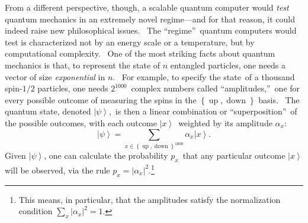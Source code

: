 \documentclass[12pt,onecolumn]{article}%
\begin{document}
From a different perspective, though, a scalable quantum computer would
\textit{test }quantum mechanics\textit{ }in an extremely novel regime---and
for that reason, it could indeed raise new philosophical issues. \ The
\textquotedblleft regime\textquotedblright\ quantum computers would test is
characterized not by an energy scale or a temperature, but by computational
complexity. \ One of the most striking facts about quantum mechanics is that,
to represent the state of $n$ entangled particles, one needs a vector of size
\textit{exponential} in $n$. \ For example, to specify the state\ of a
thousand spin-$1/2$ particles, one needs $2^{1000}$\ complex numbers called
\textquotedblleft amplitudes,\textquotedblright\ one for every possible
outcome of measuring the spins in the $\left\{  \operatorname*{up}%
,\operatorname*{down}\right\}  $ basis. \ The quantum state, denoted
$\left\vert \psi\right\rangle $,\ is then a linear combination or
\textquotedblleft superposition\textquotedblright\ of the possible outcomes,
with each outcome $\left\vert x\right\rangle $\ weighted by its amplitude
$\alpha_{x}$:%
\[
\left\vert \psi\right\rangle =\sum_{x\in\left\{  \operatorname*{up}%
,\operatorname*{down}\right\}  ^{1000}}\alpha_{x}\left\vert x\right\rangle .
\]
Given $\left\vert \psi\right\rangle $, one can calculate the probability
$p_{x}$\ that any particular outcome $\left\vert x\right\rangle $ will be
observed, via the rule $p_{x}=\left\vert \alpha_{x}\right\vert ^{2}%
$.\footnote{This means, in particular, that the amplitudes satisfy the
normalization condition $\sum_{x}\left\vert \alpha_{x}\right\vert ^{2}=1$.}
\end{document}
